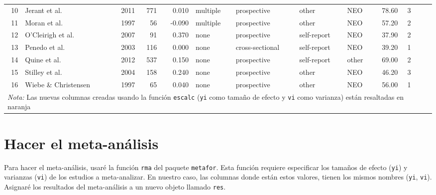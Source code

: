 \documentclass[
  bookmarksnumbered]{article}
\begin{document}
\begin{table}[H]
{\begin{tabular}[t]{rlrrrllllrr>{}r>{}r}
10 & Jerant et al. & 2011 & 771 & 0.010 & multiple & prospective & other & NEO & 78.60 & 3 & \cellcolor[HTML]{f68212}{0.0100003} & \cellcolor[HTML]{f68212}{0.0013021}\\
11 & Moran et al. & 1997 & 56 & -0.090 & multiple & prospective & other & NEO & 57.20 & 2 & \cellcolor[HTML]{f68212}{-0.0902442} & \cellcolor[HTML]{f68212}{0.0188679}\\
12 & O'Cleirigh et al. & 2007 & 91 & 0.370 & none & prospective & self-report & NEO & 37.90 & 2 & \cellcolor[HTML]{f68212}{0.3884231} & \cellcolor[HTML]{f68212}{0.0113636}\\
13 & Penedo et al. & 2003 & 116 & 0.000 & none & cross-sectional & self-report & NEO & 39.20 & 1 & \cellcolor[HTML]{f68212}{0.0000000} & \cellcolor[HTML]{f68212}{0.0088496}\\
14 & Quine et al. & 2012 & 537 & 0.150 & none & prospective & self-report & other & 69.00 & 2 & \cellcolor[HTML]{f68212}{0.1511404} & \cellcolor[HTML]{f68212}{0.0018727}\\
15 & Stilley et al. & 2004 & 158 & 0.240 & none & prospective & other & NEO & 46.20 & 3 & \cellcolor[HTML]{f68212}{0.2447741} & \cellcolor[HTML]{f68212}{0.0064516}\\
16 & Wiebe \& Christensen & 1997 & 65 & 0.040 & none & prospective & other & NEO & 56.00 & 1 & \cellcolor[HTML]{f68212}{0.0400214} & \cellcolor[HTML]{f68212}{0.0161290}\\
\bottomrule
\multicolumn{13}{l}{\rule{0pt}{1em}\textit{Nota:} Las nuevas columnas creadas usando la función \texttt{escalc} 
           (\texttt{yi} como tamaño de efecto y \texttt{vi} como varianza) están 
           resaltadas en naranja}\\
\end{tabular}}
\end{table}

\hypertarget{meta-cor}{%
\section{Hacer el meta-análisis}\label{meta-cor}}

Para hacer el meta-análisis, usaré la función \texttt{rma} del paquete \texttt{metafor}. Esta función requiere especificar los tamaños de efecto (\texttt{yi}) y varianzas (\texttt{vi}) de los estudios a meta-analizar. En nuestro caso, las columnas donde están estos valores, tienen los mismos nombres (\texttt{yi}, \texttt{vi}). Asignaré los resultados del meta-análisis a un nuevo objeto llamado \texttt{res}.
\end{document}

